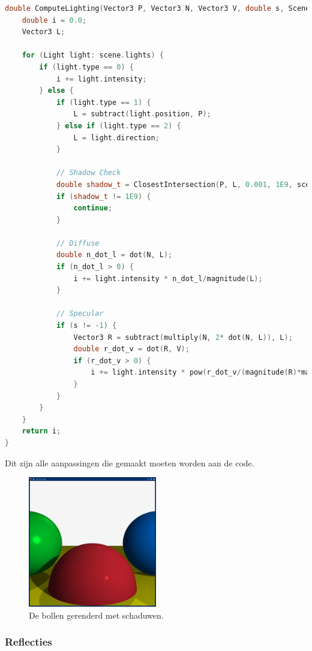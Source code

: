 \documentclass[12pt, a4paper]{article}
\begin{document}
\begin{lstlisting}[language=C++]
double ComputeLighting(Vector3 P, Vector3 N, Vector3 V, double s, Scene scene) {
    double i = 0.0;
    Vector3 L;

    for (Light light: scene.lights) {
        if (light.type == 0) {
            i += light.intensity;
        } else {
            if (light.type == 1) {
                L = subtract(light.position, P);
            } else if (light.type == 2) {
                L = light.direction;
            }

            // Shadow Check
            double shadow_t = ClosestIntersection(P, L, 0.001, 1E9, scene).second;
            if (shadow_t != 1E9) {
                continue;
            } 

            // Diffuse
            double n_dot_l = dot(N, L);
            if (n_dot_l > 0) {
                i += light.intensity * n_dot_l/magnitude(L);
            }

            // Specular
            if (s != -1) {
                Vector3 R = subtract(multiply(N, 2* dot(N, L)), L);
                double r_dot_v = dot(R, V);
                if (r_dot_v > 0) {
                    i += light.intensity * pow(r_dot_v/(magnitude(R)*magnitude(V)), s);
                }
            }
        }
    }
    return i;
}
\end{lstlisting}

Dit zijn alle aanpassingen die gemaakt moeten worden aan de code.

\begin{figure}[H]
    \centering
    \includegraphics[width=0.50\textwidth]{renders/schaduw.png}
    \caption{De bollen gerenderd met schaduwen.}
    \label{fig:schaduw}
\end{figure}

\subsubsection{Reflecties}
\end{document}
